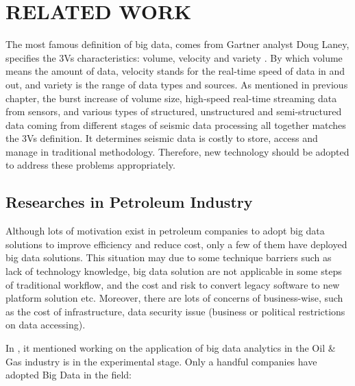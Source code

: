 %
%
%

\chapter{\uppercase{Related Work}}

The most famous definition of big data, comes from Gartner analyst Doug Laney, specifies the 3Vs characteristics: volume, velocity and variety \cite{demauro2016}. By which volume means the amount of data, velocity stands for the real-time speed of data in and out, and variety is the range of data types and sources. As mentioned in previous chapter,  the burst increase of volume size, high-speed real-time streaming data from sensors, and various types of structured, unstructured and semi-structured data coming from different stages of seismic data processing all together matches the 3Vs definition. It determines seismic data is costly to store, access and manage in traditional methodology. Therefore, new technology should be adopted to address these problems appropriately.

\section{Researches in Petroleum Industry}

Although lots of motivation exist in petroleum companies to adopt big data solutions to improve efficiency and reduce cost, only a few of them have deployed big data solutions. This situation may due to some technique barriers such as lack of technology knowledge, big data solution are not applicable in some steps of traditional workflow, and the cost and risk to convert legacy software to new platform solution etc. Moreover, there are lots of concerns of business-wise, such as the cost of infrastructure, data security issue (business or political restrictions on data accessing). 

In \cite{bigdatatooil}, it mentioned working on the application of big data analytics in the Oil \& Gas industry is in the experimental stage. Only a handful companies have adopted Big Data in the field: \\

